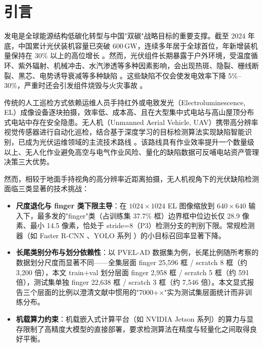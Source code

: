 \documentclass[journal,onecolumn,11pt]{IEEEtran}
\begin{document}
\section{引言}
\label{sec:intro}

发电是全球能源结构低碳化转型与中国"双碳"战略目标的重要支撑。截至 2024 年底，中国累计光伏装机容量已突破 600\,GW，连续多年居于全球首位，年新增装机量保持在 30\% 以上的高位增长 \cite{nea2024report}。然而，光伏组件长期暴露于户外环境，受温度循环、紫外辐射、机械冲击、水汽渗透等多种因素影响，会出现热斑、隐裂、栅线断裂、黑芯、电势诱导衰减等多种缺陷 \cite{kontges2014review}。这些缺陷不仅会使发电效率下降 5\%--30\%，严重时还会引发组件烧毁与火灾事故 \cite{aghaei2022review}。

传统的人工巡检方式依赖运维人员手持红外或电致发光（Electroluminescence, EL）成像设备逐块拍摄，效率低、成本高、且在大型集中式电站与高山屋顶分布式电站中存在安全隐患。无人机（Unmanned Aerial Vehicle, UAV）携带高分辨率视觉传感器进行自动化巡检，结合基于深度学习的目标检测算法实现缺陷智能识别，已成为光伏运维领域的主流技术路线 \cite{pierdicca2018deep}。该路线具有作业效率提升一个数量级以上、无人化作业避免高空与电气作业风险、量化的缺陷数据可反哺电站资产管理决策三大优势。

然而，相较于地面手持视角的高分辨率近距离拍摄，无人机视角下的光伏缺陷检测面临三类显著的技术挑战：
\begin{itemize}
\item \textbf{尺度退化与 finger 类下限主导}：在 $1024\times1024$ EL 图像缩放到 $640\times640$ 输入下，最多发的"finger"类（占训练集 37.7\% 框）边界框中位边长仅 28.9 像素、最小 14.5 像素，恰处于 stride=8（P3）检测分支的判别下限。常规检测器（如 Faster R-CNN \cite{ren2017fasterrcnn}、YOLO 系列 \cite{redmon2016yolo}）的小目标召回率显著下降。
\item \textbf{长尾类别分布与划分依赖性}：以 PVEL-AD \cite{su2023pvelad} 数据集为例，长尾比例随所考察的数据划分尺度而显著不同——全集层面 finger 25{,}596 框 / scratch 8 框（约 3{,}200 倍），本文 train+val 划分层面 finger 2{,}958 框 / scratch 5 框（约 591 倍），测试集单独 finger 22{,}638 框 / scratch 3 框（约 7{,}546 倍）。本文显式报告三个层面的比例以澄清文献中惯用的"7000+$\times$"实为测试集层面统计而非训练分布。
\item \textbf{机载算力约束}：机载嵌入式计算平台（如 NVIDIA Jetson 系列）的算力与显存限制了高精度大模型的直接部署，要求检测算法在精度与轻量化之间取得良好平衡。
\end{itemize}
\end{document}
